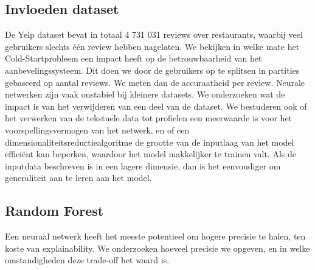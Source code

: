 \subsection{Invloeden dataset}
De Yelp dataset bevat in totaal 4 731 031 reviews over restaurants, waarbij veel gebruikers slechts één review hebben nagelaten. We bekijken in welke mate het Cold-Startprobleem een impact heeft op de betrouwbaarheid van het aanbevelingssysteem. Dit doen we door de gebruikers op te splitsen in partities gebaseerd op aantal reviews. We meten dan de accuraatheid per review.\newline
Neurale netwerken zijn vaak onstabiel bij kleinere datasets. We onderzoeken wat de impact is van het verwijderen van een deel van de dataset.\newline
We bestuderen ook of het verwerken van de tekstuele data tot profielen een meerwaarde is voor het voorspellingsvermogen van het netwerk, en of een dimensionaliteitsreductiealgoritme de grootte van de inputlaag van het model efficiënt kan beperken, waardoor het model makkelijker te trainen valt. Als de inputdata beschreven is in een lagere dimensie, dan is het eenvoudiger om generaliteit aan te leren aan het model. \cite{curse_of_dim}

\subsection{Random Forest}
Een neuraal netwerk heeft het meeste potentieel om hogere precisie te halen, ten koste van explainability. We onderzoeken hoeveel precisie we opgeven, en in welke omstandigheden deze trade-off het waard is.
